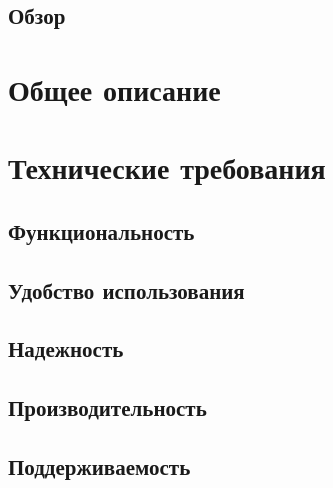 \documentclass{article}
\begin{document}
\subsection{Обзор}



\section{Общее описание}



\section{Технические требования}

\subsection{Функциональность}


\subsection{Удобство использования}


\subsection{Надежность}


\subsection{Производительность}


\subsection{Поддерживаемость}

\end{document}
